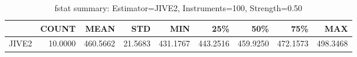 \begin{table}[ht]
\centering
\caption{fstat summary: Estimator=JIVE2, Instruments=100, Strength=0.50}
\begin{tabular}{lrrrrrrrr}
\toprule
 & COUNT & MEAN & STD & MIN & 25\% & 50\% & 75\% & MAX \\
\midrule
JIVE2 & 10.0000 & 460.5662 & 21.5683 & 431.1767 & 443.2516 & 459.9250 & 472.1573 & 498.3468 \\
\bottomrule
\end{tabular}
\end{table}
